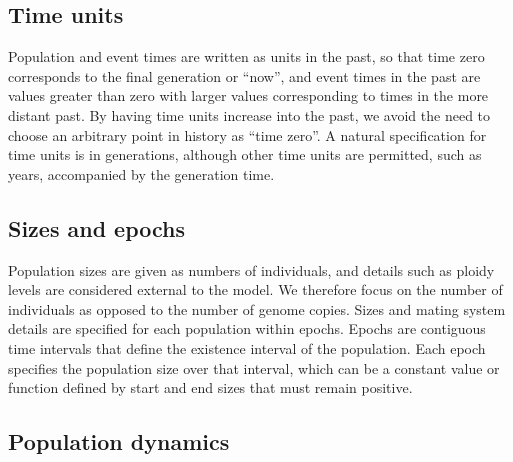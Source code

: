 \documentclass[11pt]{article}
\newcommand{\krtcomment}[1]{{\textcolor{purple}{KRT: #1}}}
\begin{document}
\subsection{Time units}

Population and event times are written as units in the past, so that time zero
corresponds to the final generation or ``now'', and event times in the past are
values greater than zero with larger values corresponding to times in the more
distant past. By having time units increase into the past, we avoid the need to
choose an arbitrary point in history as ``time zero''. A natural
specification for time units is in generations, although other time units are
permitted, such as years, accompanied by the generation time.

\subsection{Sizes and epochs}

Population sizes are given as numbers of individuals, and details
such as ploidy levels are considered external to the model.
We therefore focus on the number of individuals as opposed
to the number of genome copies.
Sizes and mating system details are specified for each population within
epochs.
Epochs are contiguous time intervals that define
the existence interval of the population. Each epoch specifies the population size
over that interval, which can be a constant value or function defined by start
and end sizes that must remain positive.



\subsection{Population dynamics}
\end{document}

